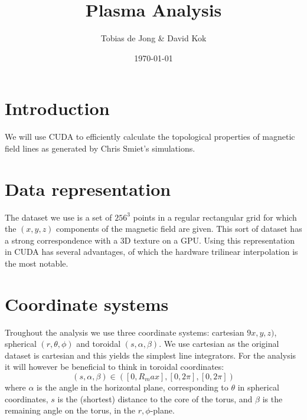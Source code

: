\documentclass{article}
\begin{document}
\title{Plasma Analysis}
\author{Tobias de Jong \& David Kok}
\date{\today}
\maketitle
\section{Introduction}
We will use CUDA to efficiently calculate the topological properties of magnetic field lines as generated by Chris Smiet's simulations.
\section{Data representation}
The dataset we use is a set of $256^3$ points in a regular rectangular grid for which the $(x,y,z)$ components of the magnetic field are given. This sort of dataset has a strong correspondence with a 3D texture on a GPU. Using this representation in CUDA has several advantages, of which the hardware trilinear interpolation is the most notable.
\section{Coordinate systems}
Troughout the analysis we use three coordinate systems: cartesian $9x,y,z)$, spherical $(r,\theta,\phi)$ and toroidal $(s,\alpha, \beta)$. We use cartesian as the original dataset is cartesian and this yields the simplest line integrators. For the analysis it will however be beneficial to think in toroidal coordinates:
\[(s,\alpha,\beta)\in ([0,R_max],[0,2\pi],[0,2\pi])\]
where $\alpha$ is the angle in the horizontal plane, corresponding to $\theta$ in spherical coordinates, $s$ is the (shortest) distance to the core of the torus, and $\beta$ is the remaining angle on the torus, in the $r,\phi$-plane.
\end{document}
